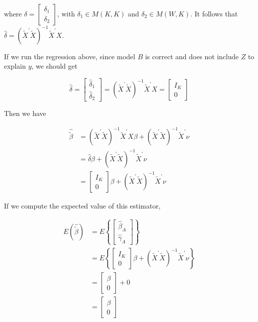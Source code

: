 where $\delta=\left[\begin{array}{l}\delta_{1} \\ \delta_{2}\end{array}\right]$, with $\delta_{1} \in M(K, K)$ and $\delta_{2} \in M(W, K)$. It follows that $\widehat{\delta}=\left(\tilde{X}^{\prime} \tilde{X}\right)^{-1} \tilde{X}^{\prime} X$.

If we run the regression above, since model $B$ is correct and does not include $Z$ to explain $y$, we should get

$$
\widehat{\delta}=\left[\begin{array}{l}
\widehat{\delta}_{1} \\
\widehat{\delta}_{2}
\end{array}\right]=\left(\tilde{X}^{\prime} \tilde{X}\right)^{-1} \tilde{X}^{\prime} X=\left[\begin{array}{c}
I_{K} \\
0
\end{array}\right]
$$

Then we have

$$
\begin{aligned}
\widehat{\tilde{\beta}} & =\left(\tilde{X}^{\prime} \tilde{X}\right)^{-1} \tilde{X}^{\prime} X \beta+\left(\tilde{X}^{\prime} \tilde{X}\right)^{-1} \tilde{X}^{\prime} \nu \\
& =\widehat{\delta} \beta+\left(\tilde{X}^{\prime} \tilde{X}\right)^{-1} \tilde{X}^{\prime} \nu \\
& =\left[\begin{array}{c}
I_{K} \\
0
\end{array}\right] \beta+\left(\tilde{X}^{\prime} \tilde{X}\right)^{-1} \tilde{X}^{\prime} \nu
\end{aligned}
$$

If we compute the expected value of this estimator,

$$
\begin{aligned}
E(\widehat{\tilde{\beta}}) & =E\left\{\left[\begin{array}{c}
\widehat{\beta}_{A} \\
\widehat{\gamma}_{A}
\end{array}\right]\right\} \\
& =E\left\{\left[\begin{array}{c}
I_{K} \\
0
\end{array}\right] \beta+\left(\tilde{X}^{\prime} \tilde{X}\right)^{-1} \tilde{X}^{\prime} \nu\right\} \\
& =\left[\begin{array}{c}
\beta \\
0
\end{array}\right]+0 \\
& =\left[\begin{array}{c}
\beta \\
0
\end{array}\right]
\end{aligned}
$$

